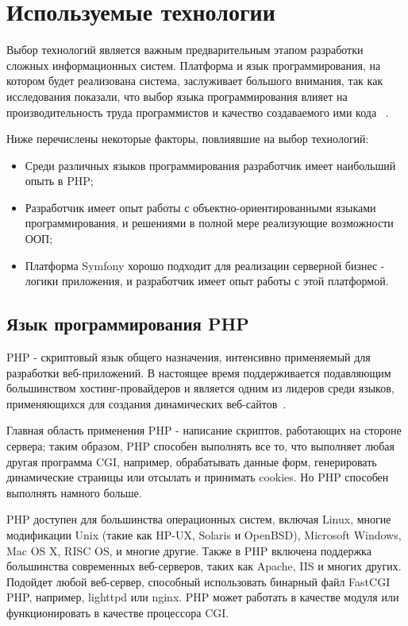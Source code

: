 \section{Используемые технологии} 
\label{sec:practice:technology_used}
Выбор технологий является важным предварительным этапом разработки сложных информационных систем. Платформа и язык программирования, на котором будет реализована система, заслуживает большого внимания, так как исследования показали, что выбор языка программирования влияет на производительность труда программистов и качество создаваемого ими кода ~\cite{mcconnell_2005}.

Ниже перечислены некоторые факторы, повлиявшие на выбор технологий:
\begin{itemize}
  \item Среди различных языков программирования разработчик имеет наибольший опыть в PHP;
  \item Разработчик имеет опыт работы с объектно-ориентированными языками программирования, и решениями в полной мере реализующие возможности ООП;
  \item Платформа Symfony хорошо подходит для реализации серверной бизнес - логики приложения, и разработчик имеет опыт работы с этой платформой.
\end{itemize}


\subsection{Язык программирования PHP}
\label{sub:practice:php_overview}
PHP - скриптовый язык общего назначения, интенсивно применяемый для разработки веб-приложений. В настоящее время поддерживается подавляющим большинством хостинг-провайдеров и является одним из лидеров среди языков, применяющихся для создания динамических веб-сайтов~\cite{php_documents}.

Главная область применения PHP - написание скриптов, работающих на стороне сервера; таким образом, PHP способен выполнять все то, что выполняет любая другая программа CGI, например, обрабатывать данные форм, генерировать динамические страницы или отсылать и принимать cookies. Но PHP способен выполнять намного больше.

PHP доступен для большинства операционных систем, включая Linux, многие модификации Unix (такие как HP-UX, Solaris и OpenBSD), Microsoft Windows, Mac OS X, RISC OS, и многие другие. Также в PHP включена поддержка большинства современных веб-серверов, таких как Apache, IIS и многих других. Подойдет любой веб-сервер, способный использовать бинарный файл FastCGI PHP, например, lighttpd или nginx. PHP может работать в качестве модуля или функционировать в качестве процессора CGI.

